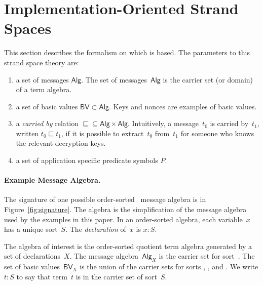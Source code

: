\documentclass[12pt]{article}
\newcommand{\typ}{\mathbin:}
\renewcommand{\alg}[1]{\ensuremath{\mathsf{#1}}}
\newcommand{\msg}{\alg{Alg}}
\newcommand{\atm}{\alg{BV}}
\newcommand{\atom}{basic value}
\begin{document}
\section{Implementation-Oriented Strand Spaces}\label{sec:strand spaces}

This section describes the formalism on which {\cpsa} is based.  The
parameters to this strand space theory are:
\begin{enumerate}
  \item a set of messages \msg.  The set of messages~{\msg} is the
  carrier set (or domain) of a term algebra.
  \item a set of {\atom}s $\atm\subset\msg$.  Keys and nonces are
  examples of {\atom}s.
  \item a \emph{carried by} relation
    ${\sqsubseteq}\subseteq\msg\times\msg$.  Intuitively, a
    message~$t_0$ is carried by~$t_1$, written $t_0\sqsubseteq t_1$,
    if it is possible to extract~$t_0$ from~$t_1$ for someone who
    knows the relevant decryption keys.
  \item a set of application specific predicate symbols $P$.
\end{enumerate}

\paragraph{Example Message Algebra.}
The signature of one possible order-sorted~\cite{GoguenMeseguer92}
message algebra is in Figure~\ref{fig:signature}.  The algebra is the
simplification of the {\cpsa} message algebra used by the examples in
this paper.  In an order-sorted algebra, each variable~$x$ has a
unique sort~$S$.  The \emph{declaration} of~$x$ is $x\typ S$.

The algebra of interest is the order-sorted quotient term algebra
generated by a set of declarations~$X$.  The message algebra~$\msg_X$
is the carrier set for sort~.  The set of {\atom}s~$\atm_X$ is
the union of the carrier sets for sorts , , and .
We write $t\typ S$ to say that term~$t$ is in the carrier set of
sort~$S$.
\end{document}
